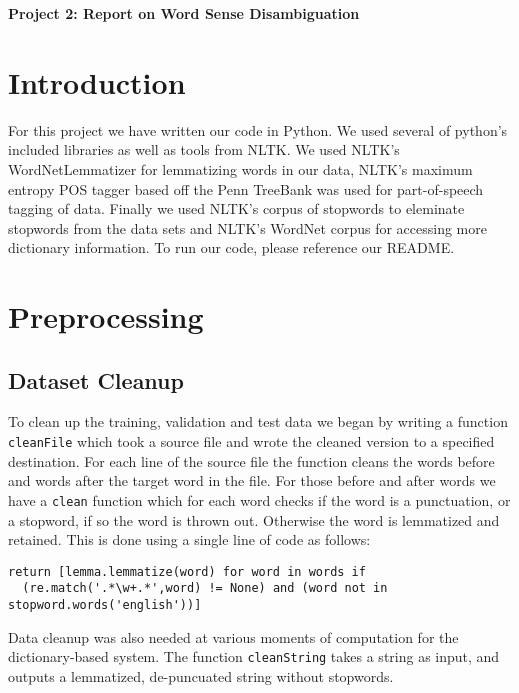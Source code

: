 \documentclass{article}
\begin{document}
\begin{center}\textbf{Project 2: Report on Word Sense Disambiguation}\end{center}

\section{Introduction}

For this project we have written our code in Python. We used several of python's included libraries as well as tools from NLTK. We used NLTK's WordNetLemmatizer for lemmatizing words in our data, NLTK's maximum entropy POS tagger based off the Penn TreeBank was used for part-of-speech tagging of data. Finally we used NLTK's corpus of stopwords to eleminate stopwords from the data sets and NLTK's WordNet corpus for accessing more dictionary information. To run our code, please reference our README.

\section{Preprocessing}

\subsection{Dataset Cleanup}

To clean up the training, validation and test data we began by writing a function \texttt{cleanFile} which took a source file and wrote the cleaned version to a specified destination. For each line of the source file the function cleans the words before and words after the target word in the file. For those before and after words we have a \texttt{clean} function which for each word checks if the word is a punctuation, or a stopword, if so the word is thrown out. Otherwise the word is lemmatized and retained. This is done using a single line of code as follows:

{\small
\begin{verbatim}
return [lemma.lemmatize(word) for word in words if
  (re.match('.*\w+.*',word) != None) and (word not in stopword.words('english'))]
\end{verbatim}
}

Data cleanup was also needed at various moments of computation for the dictionary-based system. The function \texttt{cleanString} takes a string as input, and outputs a lemmatized, de-puncuated string without stopwords.
\end{document}
